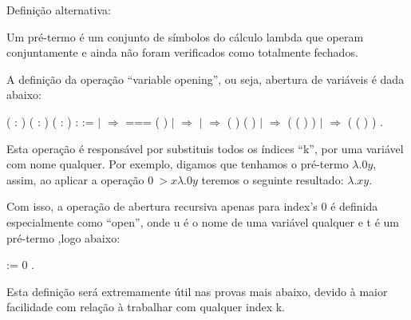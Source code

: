 Definição alternativa:


Um pré-termo é um conjunto de símbolos do cálculo lambda que operam conjuntamente e ainda
não foram verificados como totalmente fechados.\begin{coqdoccode}
\coqdocemptyline
\coqdocemptyline
\end{coqdoccode}
A definição da operação ``variable opening'', ou seja, abertura de variáveis é dada abaixo:\begin{coqdoccode}
\coqdocemptyline
\coqdocnoindent
{}  ( : ) ( : ) ( : ) :  :=\coqdoceol
\coqdocindent{1.00em}
  \coqdoceol
\coqdocindent{1.00em}
\ensuremath{|}      \ensuremath{\Rightarrow}   ===     ( )\coqdoceol
\coqdocindent{1.00em}
\ensuremath{|}      \ensuremath{\Rightarrow}  \coqdoceol
\coqdocindent{1.00em}
\ensuremath{|}    \ensuremath{\Rightarrow}  (   ) (   )\coqdoceol
\coqdocindent{1.00em}
\ensuremath{|}      \ensuremath{\Rightarrow}  ( ( )  )\coqdoceol
\coqdocindent{1.00em}
\ensuremath{|}      \ensuremath{\Rightarrow}  ( ( )  )\coqdoceol
\coqdocindent{1.00em}
.\coqdoceol
\coqdocemptyline
\end{coqdoccode}
Esta operação é responsável por substituis todos os índices ``k'', por uma variável com
nome qualquer. Por exemplo, digamos que tenhamos o pré-termo $\lambda.0 y$, assim, ao aplicar
a operação $ {0 ~> x} \lambda.0 y$ teremos o seguinte resultado: $\lambda.x y$.

 Com isso, a operação de abertura recursiva apenas para index's 0 é definida especialmente 
como ``open'', onde u é o nome de uma variável qualquer e t é um pré-termo ,logo abaixo:\begin{coqdoccode}
\coqdocemptyline
\coqdocnoindent
{}    :=  0  .\coqdoceol
\coqdocemptyline
\end{coqdoccode}
Esta definição será extremamente útil nas provas mais abaixo, devido à maior facilidade com relação
à trabalhar com qualquer index k.

